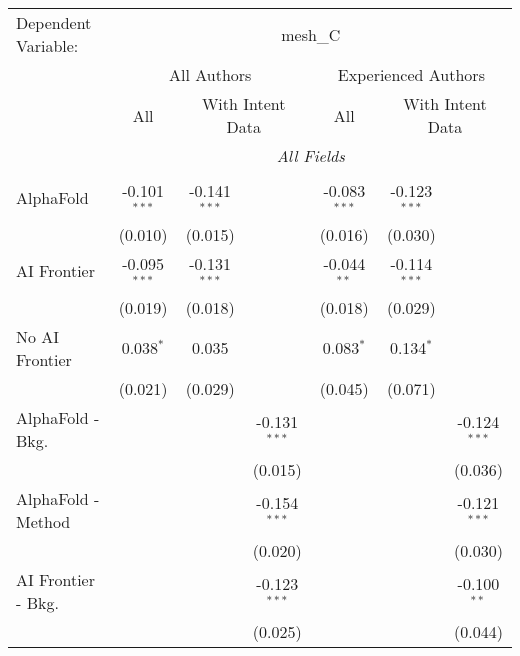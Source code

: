 \begingroup
\centering
\begin{tabular}{lcccccc}
   \tabularnewline \midrule \midrule
   Dependent Variable: & \multicolumn{6}{c}{mesh\_C}\\
 & \multicolumn{3}{c}{All Authors} & \multicolumn{3}{c}{Experienced Authors} \\
\cmidrule(lr){2-4} \cmidrule(lr){5-7}
 & \multicolumn{1}{c}{All} & \multicolumn{2}{c}{With Intent Data} & \multicolumn{1}{c}{All} & \multicolumn{2}{c}{With Intent Data} \\
\cmidrule(lr){2-2} \cmidrule(lr){3-4} \cmidrule(lr){5-5} \cmidrule(lr){6-7}
 & \multicolumn{6}{c}{\textit{All Fields}} \\ \\
   AlphaFold               & -0.101$^{***}$ & -0.141$^{***}$ &                & -0.083$^{***}$ & -0.123$^{***}$ &   \\   
                           & (0.010)        & (0.015)        &                & (0.016)        & (0.030)        &   \\   
   AI Frontier             & -0.095$^{***}$ & -0.131$^{***}$ &                & -0.044$^{**}$  & -0.114$^{***}$ &   \\   
                           & (0.019)        & (0.018)        &                & (0.018)        & (0.029)        &   \\   
   No AI Frontier          & 0.038$^{*}$    & 0.035          &                & 0.083$^{*}$    & 0.134$^{*}$    &   \\   
                           & (0.021)        & (0.029)        &                & (0.045)        & (0.071)        &   \\   
   AlphaFold - Bkg.        &                &                & -0.131$^{***}$ &                &                & -0.124$^{***}$\\   
                           &                &                & (0.015)        &                &                & (0.036)\\   
   AlphaFold - Method      &                &                & -0.154$^{***}$ &                &                & -0.121$^{***}$\\   
                           &                &                & (0.020)        &                &                & (0.030)\\   
   AI Frontier - Bkg.      &                &                & -0.123$^{***}$ &                &                & -0.100$^{**}$\\   
                           &                &                & (0.025)        &                &                & (0.044)\\   

\end{tabular}
